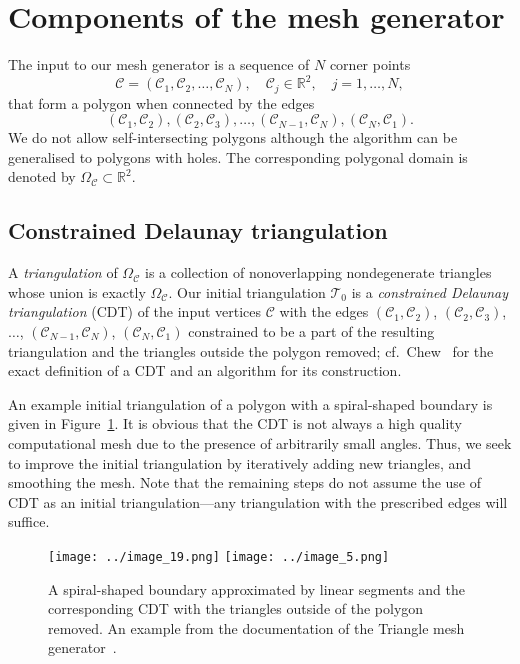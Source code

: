 \documentclass[12pt]{rmstyle}
\begin{document}
\section{Components of the mesh generator}
\label{sec:components}

The input to
our mesh generator is a sequence of \(N\) corner points
$$\mathcal{C} = (\mathcal{C}_1, \mathcal{C}_2, \dots, \mathcal{C}_N), \quad \mathcal{C}_j \in \mathbb{R}^2, \quad j = 1,\dots,N,$$
that form a polygon when connected by the edges
$$(\mathcal{C}_1, \mathcal{C}_2), (\mathcal{C}_2,\mathcal{C}_3),
\dots, (\mathcal{C}_{N-1}, \mathcal{C}_N), (\mathcal{C}_N,\mathcal{C}_1).$$
We do not allow self-intersecting polygons although
the algorithm can be generalised to polygons
with holes.
The corresponding polygonal domain is denoted
by \(\Omega_{\mathcal{C}} \subset \mathbb{R}^2\).

\subsection{Constrained Delaunay triangulation}
\label{sec:cdt}

A \emph{triangulation} of \(\Omega_{\mathcal{C}}\) is a
collection of nonoverlapping nondegenerate triangles whose union is exactly
\(\Omega_{\mathcal{C}}\).  Our initial triangulation \(\mathcal{T}_0\) is a
\emph{constrained Delaunay triangulation} (CDT) of the input vertices
\(\mathcal{C}\) with the edges \((\mathcal{C}_1, \mathcal{C}_2)\),
\((\mathcal{C}_2,\mathcal{C}_3)\), \(\dots\), \((\mathcal{C}_{N-1},
\mathcal{C}_N)\), \((\mathcal{C}_N, \mathcal{C}_1)\) constrained to be a part of
the resulting triangulation and the triangles outside the polygon removed;
cf.~Chew~\cite{Chew_1987} for the exact definition of a CDT and an algorithm for
its construction.

An example initial triangulation of a polygon with a spiral-shaped boundary is
given in Figure~\ref{fig:cdt}. It is obvious that the CDT is not always a high
quality computational mesh due to the presence of arbitrarily small angles.
Thus, we seek to improve the initial triangulation by iteratively adding new
triangles, and smoothing the mesh.  Note that the remaining steps do not assume
the use of CDT as an initial triangulation---any triangulation with the
prescribed edges will suffice.

\begin{figure}[htbp]
  \centering
  \texttt{[image: ../image\_19.png]}
  \texttt{[image: ../image\_5.png]}
\caption{A spiral-shaped boundary approximated by linear segments and the
  corresponding CDT with the triangles outside of the polygon removed.  An
  example from the documentation of the Triangle mesh
  generator~\cite{shewchuk1996triangle}.}
\label{fig:cdt}
\end{figure}
\end{document}
